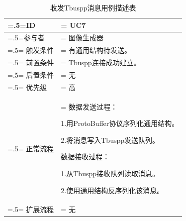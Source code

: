 \begin{table}[htbp]
    \begin{center}
        \caption{收发Tbuspp消息用例描述表}
        \label{usecase7}
        \renewcommand\arraystretch{1.5}
        \begin{tabularx}{0.8\textwidth}{ 
            | >{\centering\arraybackslash\hsize=.5\hsize\linewidth=\hsize}X 
            | >{\raggedright\arraybackslash\hsize=1.5\hsize\linewidth=\hsize}X 
            | }
            \hline
            \textbf{ID} & \textbf{UC7}\\
            \hline
            参与者 & 图像生成器\\
            \hline
            触发条件 & 有通用结构待发送。\\
            \hline
            前置条件 & Tbuspp连接成功建立。\\
            \hline
            后置条件 & 无\\
            \hline
            优先级 & 高\\
            \hline
            正常流程 &  数据发送过程：\par 1.用ProtoBuffer协议序列化通用结构。\par 2.将消息写入Tbuspp发送队列。\par 
                       数据接收过程：\par 1.从Tbuspp接收队列读取消息。\par   2.使用通用结构反序列化该消息。\\
            \hline
            扩展流程 & 无\\
            \hline
        \end{tabularx}
    \end{center}
\end{table}






